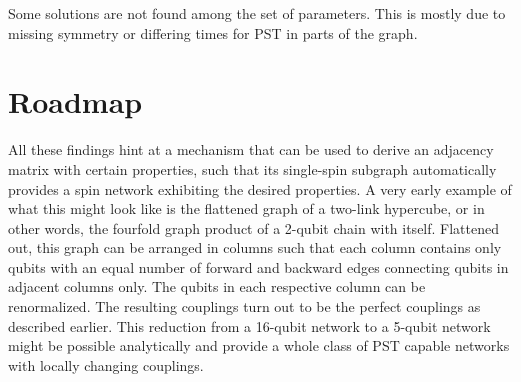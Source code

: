 \begin{center}
\end{center}

\noindent Some solutions are not found among the set of parameters. This is mostly due to missing symmetry or differing times for PST in parts of the graph.


\section{Roadmap}

\begin{center}
\end{center}

\noindent All these findings hint at a mechanism that can be used to derive an adjacency matrix with certain properties, such that its single-spin subgraph automatically provides a spin network exhibiting the desired properties. A very early example of what this might look like is the flattened graph of a two-link hypercube, or in other words, the fourfold graph product of a 2-qubit chain with itself. Flattened out, this graph can be arranged in columns such that each column contains only qubits with an equal number of forward and backward edges connecting qubits in adjacent columns only. The qubits in each respective column can be renormalized\cite{Christandl2005}. The resulting couplings turn out to be the perfect couplings as described earlier. This reduction from a 16-qubit network to a 5-qubit network might be possible analytically and provide a whole class of PST capable networks with locally changing couplings.





